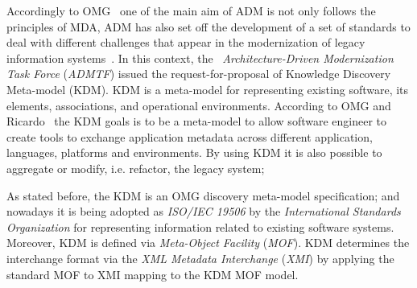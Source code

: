 \documentclass[]{article}
\begin{document}
Accordingly to OMG~\cite{OMGADM} one of the main aim of ADM is not only follows the principles of MDA, ADM has also set off the development of a set of standards to deal with different challenges that appear in the modernization of legacy information systems~\cite{1686216}. In this context, the ~\emph{Architecture-Driven Modernization Task Force} (\emph{ADMTF}) issued the request-for-proposal of Knowledge Discovery Meta-model (KDM).  KDM is a meta-model for representing existing software, its elements, associations, and operational environments. According to OMG and Ricardo~\cite{OMGADM, ricardo} the KDM goals is to be a meta-model to allow software engineer to create tools to exchange application metadata across different application, languages, platforms and environments. By using KDM it is also possible to aggregate or modify, i.e. refactor, the legacy system;

As stated before, the KDM is an OMG discovery meta-model specification; and nowadays it is being adopted as \emph{ISO/IEC 19506} by the \emph{International Standards Organization} for representing information related to existing software systems. Moreover, KDM is defined via \emph{Meta-Object Facility} (\emph{MOF}). KDM determines the interchange format via the \emph{XML Metadata Interchange} (\emph{XMI}) by applying the standard MOF to XMI mapping to the KDM MOF model. 
\end{document}
